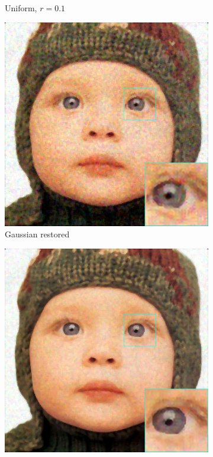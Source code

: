 \begin{figure}
\begin{subfigure}{0.24\textwidth}
		\caption{Uniform, $r=0.1$}
	\end{subfigure}
	\begin{subfigure}{0.24\textwidth}
		\includegraphics[width=\textwidth]{images/exp2.3/gaussian.png}
		\caption{Gaussian restored}
	\end{subfigure}
	\begin{subfigure}{0.24\textwidth}
		\includegraphics[width=\textwidth]{images/exp2.3/poisson.png}

\end{subfigure}
\end{figure}
